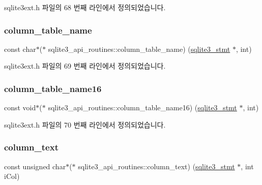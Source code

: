 sqlite3ext.\+h 파일의 68 번째 라인에서 정의되었습니다.

\mbox{\label{structsqlite3__api__routines_a06525d1223f774274ff49b287d33a952}} 
\subsubsection{\texorpdfstring{column\+\_\+table\+\_\+name}{column\_table\_name}}
{\footnotesize\ttfamily const char$\ast$($\ast$ sqlite3\+\_\+api\+\_\+routines\+::column\+\_\+table\+\_\+name) (\hyperlink{sqlite3_8h_af2a033da1327cdd77f0a174a09aedd0c}{sqlite3\+\_\+stmt} $\ast$, int)}



sqlite3ext.\+h 파일의 69 번째 라인에서 정의되었습니다.

\mbox{\label{structsqlite3__api__routines_a3252c82d0f2ed7e88a76f26585d13bbb}} 
\subsubsection{\texorpdfstring{column\+\_\+table\+\_\+name16}{column\_table\_name16}}
{\footnotesize\ttfamily const void$\ast$($\ast$ sqlite3\+\_\+api\+\_\+routines\+::column\+\_\+table\+\_\+name16) (\hyperlink{sqlite3_8h_af2a033da1327cdd77f0a174a09aedd0c}{sqlite3\+\_\+stmt} $\ast$, int)}



sqlite3ext.\+h 파일의 70 번째 라인에서 정의되었습니다.

\mbox{\label{structsqlite3__api__routines_ae9bb95b6e37236693ca5ec51598c7908}} 
\subsubsection{\texorpdfstring{column\+\_\+text}{column\_text}}
{\footnotesize\ttfamily const unsigned char$\ast$($\ast$ sqlite3\+\_\+api\+\_\+routines\+::column\+\_\+text) (\hyperlink{sqlite3_8h_af2a033da1327cdd77f0a174a09aedd0c}{sqlite3\+\_\+stmt} $\ast$, int i\+Col)}




